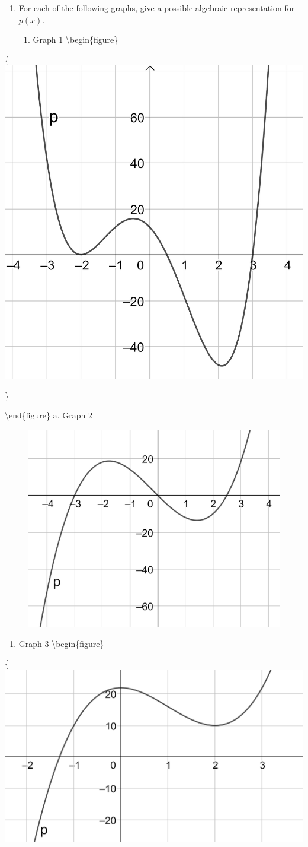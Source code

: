 \documentclass[
]{book}
\providecommand{\tightlist}{%
  \setlength{\itemsep}{0pt}\setlength{\parskip}{0pt}}
\theoremstyle{definition}
\theoremstyle{definition}
\theoremstyle{definition}
\theoremstyle{definition}
\theoremstyle{remark}
\begin{document}
\begin{enumerate}
  \begin{enumerate}
  \def\labelenumii{\alph{enumii}.}
  \tightlist
  \item
    \({\displaystyle f(x)=(x-1)(x+2)^2(2x-3)}\)
  \item
    \({\displaystyle f(x)=(2x+1)(x+3)^3(x-2)^2}\)
  \end{enumerate}
\item
  For each of the following graphs, give a possible algebraic representation for \(p(x)\).

  \begin{enumerate}
  \def\labelenumii{\alph{enumii}.}
  \tightlist
  \item
    Graph 1
    \textbackslash begin\{figure\}
  \end{enumerate}
\end{enumerate}

\{\centering \includegraphics[width=0.3\linewidth]{images/polygraph1}

\}

\textbackslash end\{figure\}
a. Graph 2

\begin{figure}

{\centering \includegraphics[width=0.3\linewidth]{images/polygraph2} 

}

\end{figure}

\begin{enumerate}
\def\labelenumi{\alph{enumi}.}
\tightlist
\item
  Graph 3
  \textbackslash begin\{figure\}
\end{enumerate}

\{\centering \includegraphics[width=0.4\linewidth]{images/polygraph3}
\end{document}
